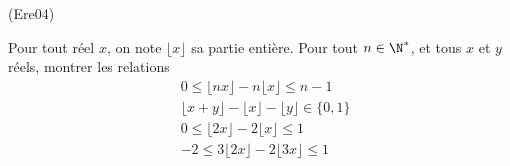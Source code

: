 \begin{tiny}(Ere04)\end{tiny} Pour tout réel $x$, on note $\lfloor x \rfloor$ sa partie entière.  Pour tout $n\in \N^*$, et tous $x$ et $y$ réels, montrer les
relations
\begin{align*}
&0 \leq  \lfloor nx\rfloor - n\lfloor x\rfloor \leq n-1 \\
& \lfloor x+y \rfloor -\lfloor x \rfloor -\lfloor y \rfloor \in \{0,1\}\\
&0 \leq \lfloor 2x \rfloor -2\lfloor x\rfloor \leq 1\\
&-2 \leq 3\lfloor 2x \rfloor -2\lfloor 3x\rfloor \leq 1
\end{align*}
